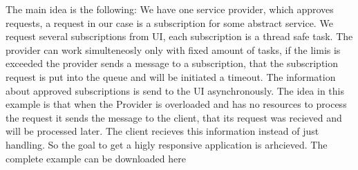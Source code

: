 	   The main idea is the following:
		 We have one service provider, which approves requests, a request in our case
		 is a subscription for some abstract service.
		 We request several subscriptions from UI, each subscription is a thread safe task. The provider can work simulteneosly
		 only with fixed amount of tasks, if the limis is exceeded the provider sends a message to a subscription,
		 that the subscription request is put into the queue and will be initiated a
		 timeout. The information about approved subscriptions is send to the UI
		 asynchronously. The idea in this example is that when the Provider is
		 overloaded and has no resources to process the request it sends the message
		 to the client, that its request was recieved and will be processed later. The
		 client recieves this information instead of just handling. So the goal to get
		 a higly responsive application is arhcieved. The complete example can be
		 downloaded here \cite{vaadinAkka}
	
  